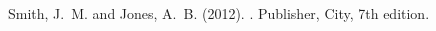 \documentclass{article}
\begin{document}

\begin{thebibliography}{9}

Smith, J.~M. and Jones, A.~B. (2012).
.
\newblock Publisher, City, 7th edition.

\end{thebibliography}
\end{document}
